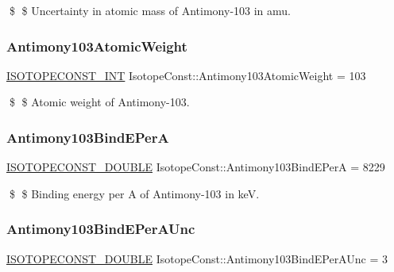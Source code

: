 \$ \$ Uncertainty in atomic mass of Antimony-\/103 in amu. \mbox{\label{group___isotope_const-_antimony-_sb103_gaf7e30b3d3e62a66c792acb3826686b4d}} 
\subsubsection{\texorpdfstring{Antimony103\+Atomic\+Weight}{Antimony103AtomicWeight}}
{\footnotesize\ttfamily \mbox{\hyperlink{group___isotope_const-_macros_ga5f18360b3e99483a35c32d789e62621c}{I\+S\+O\+T\+O\+P\+E\+C\+O\+N\+S\+T\+\_\+\+I\+NT}} Isotope\+Const\+::\+Antimony103\+Atomic\+Weight = 103}

\$ \$ Atomic weight of Antimony-\/103. \mbox{\label{group___isotope_const-_antimony-_sb103_gad11a50270f30f486c837d353532811c0}} 
\subsubsection{\texorpdfstring{Antimony103\+Bind\+E\+PerA}{Antimony103BindEPerA}}
{\footnotesize\ttfamily \mbox{\hyperlink{group___isotope_const-_macros_ga8f45a7272ce02c0b4c65c44636ed719a}{I\+S\+O\+T\+O\+P\+E\+C\+O\+N\+S\+T\+\_\+\+D\+O\+U\+B\+LE}} Isotope\+Const\+::\+Antimony103\+Bind\+E\+PerA = 8229}

\$ \$ Binding energy per A of Antimony-\/103 in keV. \mbox{\label{group___isotope_const-_antimony-_sb103_ga63601e655def6280e67ce1654aca22ad}} 
\subsubsection{\texorpdfstring{Antimony103\+Bind\+E\+Per\+A\+Unc}{Antimony103BindEPerAUnc}}
{\footnotesize\ttfamily \mbox{\hyperlink{group___isotope_const-_macros_ga8f45a7272ce02c0b4c65c44636ed719a}{I\+S\+O\+T\+O\+P\+E\+C\+O\+N\+S\+T\+\_\+\+D\+O\+U\+B\+LE}} Isotope\+Const\+::\+Antimony103\+Bind\+E\+Per\+A\+Unc = 3}

